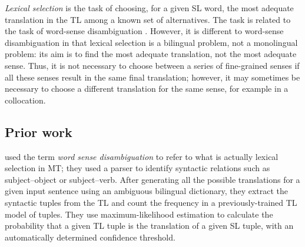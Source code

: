 \documentclass[11pt]{article}
\newcommand{\comment}[1]{\todo{#1}}
\begin{document}
\emph{Lexical selection} is the task of choosing, for a given SL word,
the most adequate translation in the TL among a known set of
alternatives.  The task is related to the task of word-sense
disambiguation \citep{ide98a}. However, it is different to word-sense
disambiguation in that lexical selection is a bilingual problem, not a
monolingual problem: its aim is to find the most adequate translation,
not the most adequate sense. Thus, it is not necessary to choose
between a series of fine-grained senses if all these senses result in
the same final translation; however, it may sometimes be necessary to
choose a different translation for the same sense, for example in a
collocation.


\subsection{Prior work}
\cite{dagan1994word} used the term \emph{word sense disambiguation} to
refer to what is actually lexical selection in MT; they
used a parser to identify syntactic relations such as subject--object
or subject--verb.  After generating all the possible translations for
a given input sentence using an ambiguous bilingual dictionary, they
extract the syntactic tuples from the TL and count the frequency in a
previously-trained TL model of tuples.  They use maximum-likelihood
estimation to calculate the probability that a given TL tuple is the
translation of a given SL tuple, with an automatically determined
confidence threshold.
\end{document}
